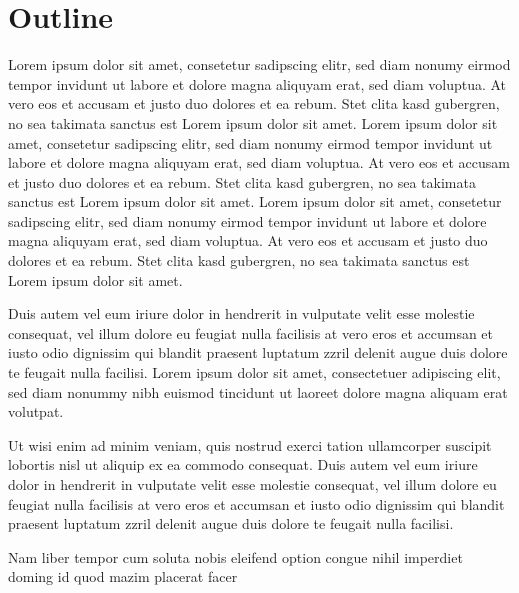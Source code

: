 \section{Outline}
Lorem ipsum dolor sit amet, consetetur sadipscing elitr, sed diam nonumy eirmod tempor invidunt ut labore et dolore magna aliquyam erat, sed diam voluptua. At vero eos et accusam et justo duo dolores et ea rebum. Stet clita kasd gubergren, no sea takimata sanctus est Lorem ipsum dolor sit amet. Lorem ipsum dolor sit amet, consetetur sadipscing elitr, sed diam nonumy eirmod tempor invidunt ut labore et dolore magna aliquyam erat, sed diam voluptua. At vero eos et accusam et justo duo dolores et ea rebum. Stet clita kasd gubergren, no sea takimata sanctus est Lorem ipsum dolor sit amet. Lorem ipsum dolor sit amet, consetetur sadipscing elitr, sed diam nonumy eirmod tempor invidunt ut labore et dolore magna aliquyam erat, sed diam voluptua.
At vero eos et accusam et justo duo dolores et ea rebum. Stet clita kasd gubergren, no sea takimata sanctus est Lorem ipsum dolor sit amet.

Duis autem vel eum iriure dolor in hendrerit in vulputate velit esse molestie consequat, vel illum dolore eu feugiat nulla facilisis at vero eros et accumsan et iusto odio dignissim qui blandit praesent luptatum zzril delenit augue duis dolore te feugait nulla facilisi. Lorem ipsum dolor sit amet, consectetuer adipiscing elit, sed diam nonummy nibh euismod tincidunt ut laoreet dolore magna aliquam erat volutpat.

Ut wisi enim ad minim veniam, quis nostrud exerci tation ullamcorper suscipit lobortis nisl ut aliquip ex ea commodo consequat. Duis autem vel eum iriure dolor in hendrerit in vulputate velit esse molestie consequat, vel illum dolore eu feugiat nulla facilisis at vero eros et accumsan et iusto odio dignissim qui blandit praesent luptatum zzril delenit augue duis dolore te feugait nulla facilisi.

Nam liber tempor cum soluta nobis eleifend option congue nihil imperdiet doming id quod mazim placerat facer
